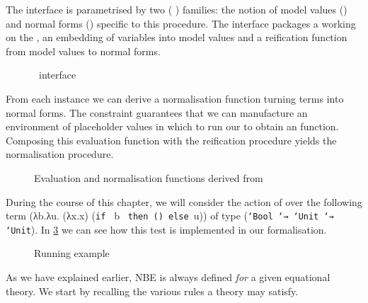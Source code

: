 The  interface is parametrised by two ( )
families: the notion of model values () and normal forms
() specific to this procedure. The interface packages a 
working on the , an embedding of variables into model values
and a reification function from model values to normal forms.

\begin{figure}[h]
\caption{~interface}\label{fig:nbeinterface}
\end{figure}

From each  instance we can derive a normalisation function turning
terms into normal forms. The  constraint guarantees that we can
manufacture an environment of placeholder values in which to run our
 to obtain an  function. Composing this evaluation
function with the reification procedure yields the normalisation procedure.

\begin{figure}[h]
\begin{minipage}[t]{0.55\textwidth}
\end{minipage}\begin{minipage}[t]{0.35\textwidth}
\end{minipage}
\caption{Evaluation and normalisation functions derived from }\label{fig:nbecorrolaries}
\end{figure}

During the course of this chapter, we will consider the action of 
over the following term (λb.λu. (λx.x) (\texttt{if~} b \texttt{~then~()~else~}u))
of type (\texttt{`Bool `→ `Unit `→ `Unit}). In \cref{fig:nbetest} we can see how this
test is implemented in our formalisation.

\begin{figure}[h]
\caption{Running example}\label{fig:nbetest}
\end{figure}

As we have explained earlier, NBE is always defined \emph{for} a given
equational theory. We start by recalling the various rules a theory may
satisfy.

